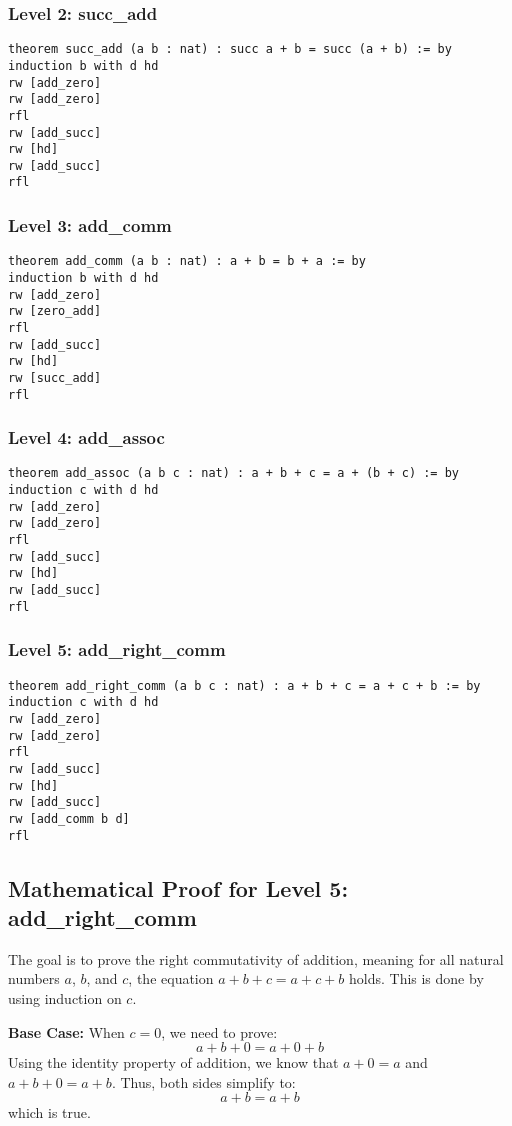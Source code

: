 \documentclass{article}
\begin{document}
\subsubsection*{Level 2: succ\_add}
\begin{lstlisting}[style=leanstyle]
theorem succ_add (a b : nat) : succ a + b = succ (a + b) := by
induction b with d hd
rw [add_zero]
rw [add_zero]
rfl
rw [add_succ]
rw [hd]
rw [add_succ]
rfl
\end{lstlisting}

\subsubsection*{Level 3: add\_comm}
\begin{lstlisting}[style=leanstyle]
theorem add_comm (a b : nat) : a + b = b + a := by
induction b with d hd
rw [add_zero]
rw [zero_add]
rfl
rw [add_succ]
rw [hd]
rw [succ_add]
rfl
\end{lstlisting}

\subsubsection*{Level 4: add\_assoc}
\begin{lstlisting}[style=leanstyle]
theorem add_assoc (a b c : nat) : a + b + c = a + (b + c) := by
induction c with d hd
rw [add_zero]
rw [add_zero]
rfl
rw [add_succ]
rw [hd]
rw [add_succ]
rfl
\end{lstlisting}

\subsubsection*{Level 5: add\_right\_comm}
\begin{lstlisting}[style=leanstyle]
theorem add_right_comm (a b c : nat) : a + b + c = a + c + b := by
induction c with d hd
rw [add_zero]
rw [add_zero]
rfl
rw [add_succ]
rw [hd]
rw [add_succ]
rw [add_comm b d]
rfl
\end{lstlisting}

\subsection*{Mathematical Proof for Level 5: add\_right\_comm}
The goal is to prove the right commutativity of addition, meaning for all natural numbers \(a\), \(b\), and \(c\), the equation \(a + b + c = a + c + b\) holds. This is done by using induction on \(c\).

\textbf{Base Case:} When \(c = 0\), we need to prove:
\[
a + b + 0 = a + 0 + b
\]
Using the identity property of addition, we know that \(a + 0 = a\) and \(a + b + 0 = a + b\). Thus, both sides simplify to:
\[
a + b = a + b
\]
which is true.
\end{document}
